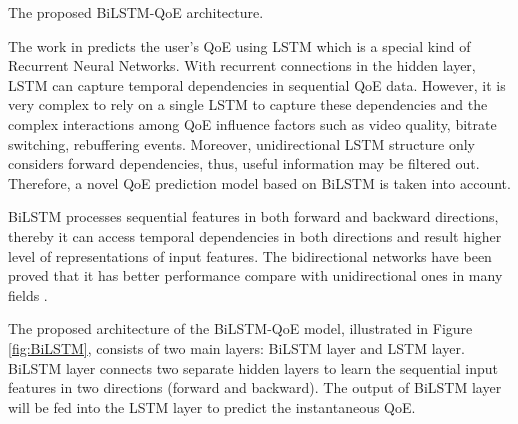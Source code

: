   {The proposed BiLSTM-QoE architecture.\label{fig:BiLSTM}}


The work in \citep{QoEModel_LSTM} predicts the user's QoE using LSTM which is a special kind of Recurrent Neural Networks.
With recurrent connections in the hidden layer, LSTM can capture temporal dependencies in sequential QoE data.
However, it is very complex to rely on a single LSTM to capture these dependencies and the complex interactions among QoE influence factors such as video quality, bitrate switching, rebuffering events.
Moreover, unidirectional LSTM structure only considers forward dependencies, thus, useful information may be filtered out.
Therefore, a novel QoE prediction model based on BiLSTM is taken into account.


BiLSTM processes sequential features in both forward and backward directions, thereby it can access temporal dependencies in both directions and result higher level of representations of input features.
The bidirectional networks have been proved that it has better performance compare with unidirectional ones in many fields \citep{BiLSTM_TrafficSpeed, BiLSTM_HybridSpeech, BiLSTM_NonNativeSpeech}.


The proposed architecture of the BiLSTM-QoE model, illustrated in Figure \ref{fig:BiLSTM}, consists of two main layers: BiLSTM layer and LSTM layer.
BiLSTM layer connects two separate hidden layers to learn the sequential input features in two directions (forward and backward).
The output of BiLSTM layer will be fed into the LSTM layer to predict the instantaneous QoE.